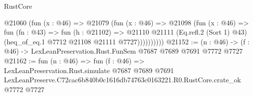 \begin{lexlean}{RustCore}
\begin{coremodule}
              @21060
                (fun (x : @46) =>
                @21079
                  (fun (x : @46) =>
                  @21098
                    (fun (x : @46) =>
                    fun (fn : @43) =>
                    fun (h : @21102) =>
                    @21110
                      @21111
                      (Eq.refl.{2} (Sort 1) @43)
                      (heq_of_eq.{1} @7712 @21108 @21111 @7727))))))))))
@21152 := (n : @46) -> (f : @46) -> LexLeanPreservation.Rust.FunSem @7687 @7689 @7691 @7772 @7727
@21162 := fun (n : @46) =>
  fun (f : @46) =>
  LexLeanPreservation.Rust.simulate
    @7687
    @7689
    @7691
    LexLeanPreserve.C72cac6b840b0c1616db74763c0163221.R0.RustCore.crate_ok
    @7772
    @7727
\end{coremodule}
\end{lexlean}
